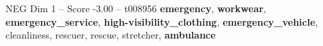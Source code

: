 \begin{textsample}{NEG Dim 1 – Score -3.00 – t008956}  \label{ex:f1_neg_037}
\textbf{emergency}, \textbf{workwear}, \textbf{emergency\_service}, \textbf{high-visibility\_clothing}, \textbf{emergency\_vehicle}, cleanliness, rescuer, rescue, stretcher, \textbf{ambulance}

\end{textsample}
